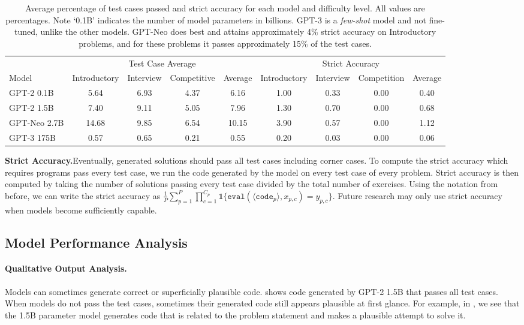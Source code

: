 \begin{table}[t]
\setlength{\tabcolsep}{2pt}
\small
\centering
\begin{tabular}{lcccc|cccc}
\multicolumn{1}{l}{} &  \multicolumn{4}{c}{Test Case Average} & \multicolumn{4}{c}{Strict Accuracy} \\
Model       & Introductory & Interview & Competitive &  Average & Introductory & Interview & Competition &  Average \\

\toprule
GPT-2 0.1B          & 5.64 & 6.93 & 4.37 & 6.16 & 1.00 & 0.33 & 0.00 & 0.40 \\
GPT-2 1.5B          & 7.40 & 9.11 & 5.05 & 7.96 & 1.30 & 0.70 & 0.00 & 0.68 \\
GPT-Neo 2.7B        & 14.68 & 9.85 & 6.54 & 10.15 & 3.90 & 0.57 & 0.00 & 1.12 \\
GPT-3 175B        & 0.57 & 0.65 & 0.21 & 0.55 & 0.20 & 0.03 & 0.00 & 0.06 \\
\end{tabular}
\caption{Average percentage of test cases passed and strict accuracy for each model and difficulty level. All values are percentages. Note `0.1B' indicates the number of model parameters in billions. GPT-3 is a \emph{few-shot} model and not fine-tuned, unlike the other models. GPT-Neo does best and attains approximately 4\% strict accuracy on Introductory problems, and for these problems it passes approximately 15\% of the test cases.}
\label{tab:results}
\end{table}

\textbf{Strict Accuracy.}\quad Eventually, generated solutions should pass all test cases including corner cases.
To compute the strict accuracy which requires programs pass every test case, we run the code generated by the model on every test case of every problem. Strict accuracy is then computed by taking the number of solutions passing every test case divided by the total number of exercises. Using the notation from before, we can write the strict accuracy as $\frac{1}{P}\sum_{p=1}^P \prod_{c=1}^{C_p} \mathds{1}\{\texttt{eval}(\langle\texttt{code}_p\rangle,x_{p,c}) = y_{p,c}\}.$ Future research may only use strict accuracy when models become sufficiently capable.


\subsection{Model Performance Analysis}

\paragraph{Qualitative Output Analysis.} Models can sometimes generate correct or superficially plausible code.  shows code generated by GPT-2 1.5B that passes all test cases. When models do not pass the test cases, sometimes their generated code still appears plausible at first glance. For example, in , we see that the 1.5B parameter model generates code that is related to the problem statement and makes a plausible attempt to solve it.


